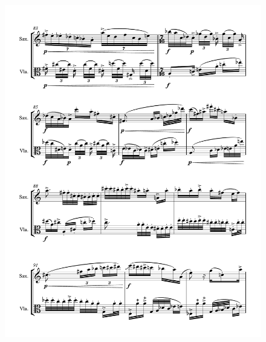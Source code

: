 \begin{figure}[htbp]
    \centering
	\includegraphics[width=6.5in]{figures/Sax_Viola_29.pdf}
\end{figure}

